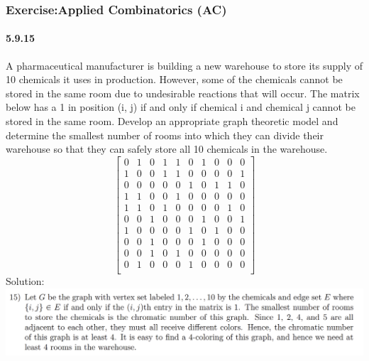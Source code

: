 \documentclass{article}
\begin{document}
\subsubsection{Exercise:Applied Combinatorics (AC)}
\paragraph{5.9.15}
A pharmaceutical manufacturer is building a new warehouse to store its supply of 10 chemicals it uses in production. However, some of the chemicals cannot be stored in the same room due to undesirable reactions that will occur. The matrix below has a 1 in position (i, j) if and only if chemical i and chemical j cannot be stored in the same room. Develop an appropriate graph theoretic model and determine the smallest number of rooms into which they can divide their warehouse so that they can safely store all 10 chemicals in the warehouse.\newline
$$\begin{bmatrix}
0 &1 &0 &1 &1 &0 &1 &0 &0 &0 \\
1 &0 &0 &1 &1 &0 &0 &0 &0 &1 \\
0 &0 &0 &0 &0 &1 &0 &1 &1 &0 \\
1 &1 &0 &0 &1 &0 &0 &0 &0 &0 \\
1 &1 &0 &1 &0 &0 &0 &0 &1 &0 \\
0 &0 &1 &0 &0 &0 &1 &0 &0 &1 \\
1 &0 &0 &0 &0 &1 &0 &1 &0 &0 \\
0 &0 &1 &0 &0 &0 &1 &0 &0 &0 \\
0 &0 &1 &0 &1 &0 &0 &0 &0 &0 \\
0 &1 &0 &0 &0 &1 &0 &0 &0 &0 \\
\end{bmatrix}$$
Solution:\newline
\includegraphics{0089}
\end{document}
